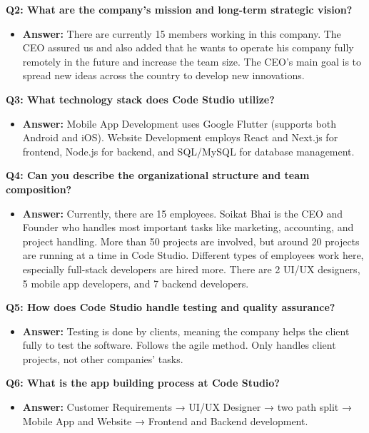 \documentclass[12pt,a4paper]{article}
\begin{document}
\textbf{Q2: What are the company's mission and long-term strategic vision?}
\begin{itemize}
    \item \textbf{Answer:} There are currently 15 members working in this company. The CEO assured us and also added that he wants to operate his company fully remotely in the future and increase the team size. The CEO's main goal is to spread new ideas across the country to develop new innovations.
\end{itemize}

\textbf{Q3: What technology stack does Code Studio utilize?}
\begin{itemize}
    \item \textbf{Answer:} Mobile App Development uses Google Flutter (supports both Android and iOS). Website Development employs React and Next.js for frontend, Node.js for backend, and SQL/MySQL for database management.
\end{itemize}

\textbf{Q4: Can you describe the organizational structure and team composition?}
\begin{itemize}
    \item \textbf{Answer:} Currently, there are 15 employees. Soikat Bhai is the CEO and Founder who handles most important tasks like marketing, accounting, and project handling. More than 50 projects are involved, but around 20 projects are running at a time in Code Studio. Different types of employees work here, especially full-stack developers are hired more. There are 2 UI/UX designers, 5 mobile app developers, and 7 backend developers.
\end{itemize}

\textbf{Q5: How does Code Studio handle testing and quality assurance?}
\begin{itemize}
    \item \textbf{Answer:} Testing is done by clients, meaning the company helps the client fully to test the software. Follows the agile method. Only handles client projects, not other companies' tasks.
\end{itemize}

\textbf{Q6: What is the app building process at Code Studio?}
\begin{itemize}
    \item \textbf{Answer:} Customer Requirements → UI/UX Designer → two path split → Mobile App and Website → Frontend and Backend development.
\end{itemize}
\end{document}
